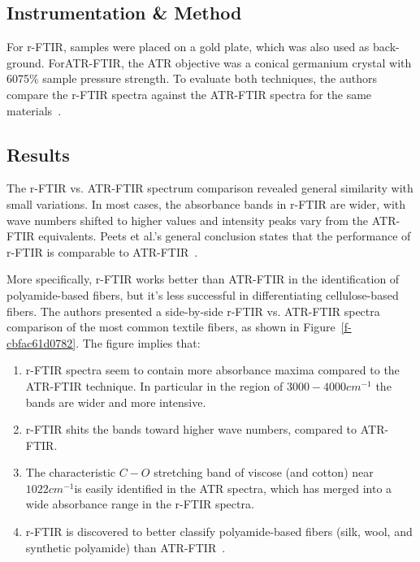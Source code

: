 \documentclass[11pt]{article}
\begin{document}
\subsection{Instrumentation \& Method}For r-FTIR, samples were placed on a gold plate, which was also used as back- ground. ForATR-FTIR, the ATR objective was a conical germanium crystal with 60{\textendash}75\% sample pressure strength. To evaluate both techniques, the authors compare the r-FTIR spectra against the ATR-FTIR spectra for the same materials\unskip~\cite{693772:16533873}.



\subsection{Results}The r-FTIR vs. ATR-FTIR spectrum comparison revealed general similarity with small variations. In most cases, the absorbance bands in r-FTIR are wider, with wave numbers shifted to higher values and intensity peaks vary from the ATR-FTIR equivalents.  Peets et al.'s general conclusion states that the performance of r-FTIR is comparable to ATR-FTIR\unskip~\cite{693772:16533873}.

More specifically, r-FTIR works better than ATR-FTIR in the identification of polyamide-based fibers, but it's less successful in differentiating cellulose-based fibers. The authors presented a side-by-side r-FTIR vs. ATR-FTIR spectra comparison of the most common textile fibers, as shown in Figure~\ref{f-cbfac61d0782}. The figure implies that:


  
  \begin{enumerate}
  \item \relax r-FTIR spectra seem to contain more absorbance maxima compared to the ATR-FTIR technique. In particular in the region of $3000-4000 cm^{-1} $ the bands are wider and more intensive.
  \item \relax r-FTIR shits the bands toward higher wave numbers, compared to ATR-FTIR.
  \item \relax The characteristic $C-O $ stretching band of viscose (and cotton) near $1022 cm^{-1} $is easily identified in the ATR spectra, which has merged into a wide absorbance range in the r-FTIR spectra.
  \item \relax r-FTIR is discovered to better classify polyamide-based fibers (silk, wool, and synthetic polyamide) than ATR-FTIR\unskip~\cite{693772:16533873}.
  \end{enumerate}
  
\end{document}
